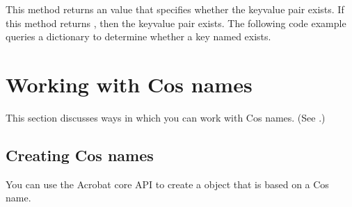 \documentclass[letterpaper,12pt,english,openany,oneside]{sphinxmanual}
\begin{document}
This method returns an  value that specifies whether the key\sphinxhyphen{}value pair exists. If this method returns , then the key\sphinxhyphen{}value pair exists. The following code example queries a dictionary to determine whether a key named  exists.

\begin{sphinxVerbatim}[commandchars=\\\{\}]
      
    
   
\end{sphinxVerbatim}


\section{Working with Cos names}
\label{\detokenize{Plugins_Cos:working-with-cos-names}}
This section discusses ways in which you can work with Cos names. (See .)


\subsection{Creating Cos names}
\label{\detokenize{Plugins_Cos:creating-cos-names}}
You can use the Acrobat core API to create a  object that is based on a Cos name.
\end{document}
